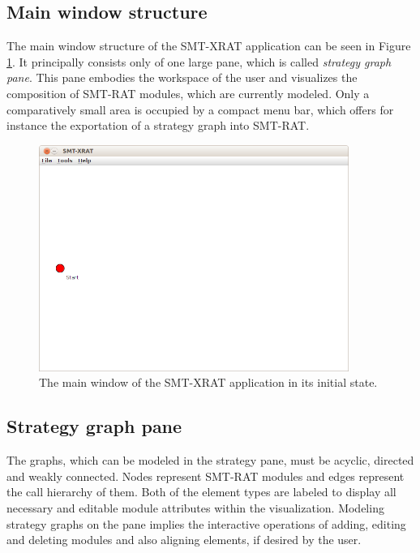 \subsection{Main window structure}
\label{sec:main_window_structure_of_smt-xrat}
The main window structure of the SMT-XRAT application can be seen 
in Figure \ref{fig:smt-xrat_main_window}. It principally consists 
only of one large pane, which is called \emph{strategy graph pane}. 
This pane embodies the workspace of the user and visualizes the 
composition of SMT-RAT modules, which are currently modeled. Only a
comparatively small area is occupied by a compact menu bar, which 
offers for instance the exportation of a strategy graph into SMT-RAT.
\begin{figure}
  \begin{center}
    \includegraphics[width=0.9\textwidth]{graphics/smt-xrat_main_window.png}
  \end{center}
  \caption{The main window of the SMT-XRAT application in its initial state.}
  \label{fig:smt-xrat_main_window}
\end{figure}

\subsection{Strategy graph pane}
\label{sec:the_strategy_graph_pane}
The graphs, which can be modeled in the strategy pane, must be acyclic, directed and weakly 
connected. Nodes represent SMT-RAT modules and edges represent the call 
hierarchy of them. Both of the element types are labeled to display all 
necessary and editable module attributes within the visualization.
Modeling strategy graphs on the pane implies the interactive operations 
of adding, editing and deleting modules and also aligning elements, 
if desired by the user.

